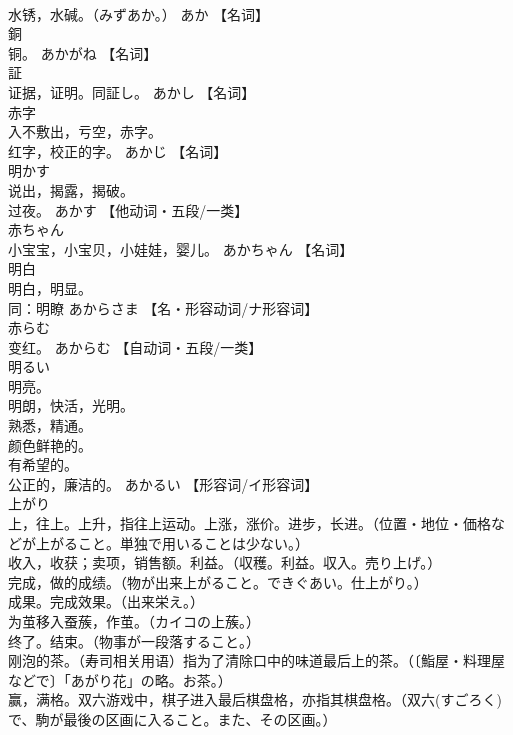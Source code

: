 \documentclass[8pt]{extreport}
\begin{document}
\begin{CJK}{UTF8}{min}
\\	水锈，水碱。（みずあか。）	あか		【名词】
\\	銅	
\\	铜。	あかがね		【名词】
\\	証	
\\	证据，证明。同証し。	あかし		【名词】
\\	赤字	
\\	入不敷出，亏空，赤字。 
\\	红字，校正的字。	あかじ		【名词】
\\	明かす	
\\	说出，揭露，揭破。 
\\	过夜。	あかす		【他动词・五段/一类】
\\	赤ちゃん	
\\	小宝宝，小宝贝，小娃娃，婴儿。	あかちゃん		【名词】
\\	明白	
\\	明白，明显。 
\\	同：明瞭	あからさま		【名・形容动词/ナ形容词】
\\	赤らむ	
\\	变红。	あからむ		【自动词・五段/一类】
\\	明るい	
\\	明亮。 
\\	明朗，快活，光明。 
\\	熟悉，精通。 
\\	颜色鲜艳的。 
\\	有希望的。 
\\	公正的，廉洁的。	あかるい		【形容词/イ形容词】
\\	上がり	
\\	上，往上。上升，指往上运动。上涨，涨价。进步，长进。（位置・地位・価格などが上がること。単独で用いることは少ない。） 
\\	收入，收获；卖项，销售额。利益。（収穫。利益。収入。売り上げ。） 
\\	完成，做的成绩。（物が出来上がること。できぐあい。仕上がり。） 
\\	成果。完成效果。（出来栄え。） 
\\	为茧移入蚕蔟，作茧。（カイコの上蔟。） 
\\	终了。结束。（物事が一段落すること。） 
\\	刚泡的茶。（寿司相关用语）指为了清除口中的味道最后上的茶。（〔鮨屋・料理屋などで〕「あがり花」の略。お茶。） 
\\	赢，满格。双六游戏中，棋子进入最后棋盘格，亦指其棋盘格。（双六(すごろく)で、駒が最後の区画に入ること。また、その区画。） 

\end{CJK}
\end{document}
